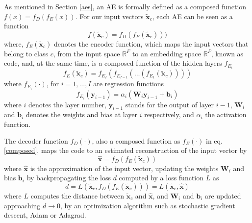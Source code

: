 \documentclass[journal,article,submit,pdftex,moreauthors]{Definitions/mdpi}
\begin{document}
As mentioned in Section \ref{aes}, an AE is formally defined as a composed function $f(x) = f_D(f_E(x))$. For our input vectors $\mathbf{\tilde{x}}_c$, each AE can be seen as a function
\begin{equation}
	f(\mathbf{\tilde{x}}_c) = f_D(f_E(\mathbf{\tilde{x}}_c)))
\end{equation}
where, $f_E(\mathbf{\tilde{x}}_c)$ denotes the encoder function, which maps the input vectors that belong to class $c$, from the input space $\mathbb{R}^F$ to an embedding space $\mathbb{R}^P$, known as code,
and, at the same time, is a composed function of the hidden layers $f_{E_i}$
\begin{equation}
	f_E(\mathbf{\tilde{x}}_c) = f_{E_{I}}(f_{E_{I-1}}(\dots (f_{E_{1}}(\mathbf{\tilde{x}}_c))))
	\label{composed}
\end{equation}
where $f_{E_{i}}(\cdot)$, for $i = 1, \dots, I$ are regression functions
\begin{equation}
	f_{E_{i}}(\mathbf{y}_{i-1}) = \alpha_i(\mathbf{W}_{i}\mathbf{y}_{i-1} + \mathbf{b}_{i})
\end{equation}
where $i$ denotes the layer number, $\mathbf{y}_{i-1}$ stands for the output of layer $i-1$, $\mathbf{W}_{i}$ and $\mathbf{b}_{i}$ denotes the weights and bias at layer $i$ respectively, and $\alpha_i$ the activation function.

The decoder function $f_D(\cdot)$, also a composed function as $f_E(\cdot)$ in eq. \ref{composed}, maps the code to an estimated reconstruction of the input vector by
\begin{equation}
	\mathbf{\hat{x}} = f_{D}(f_E(\mathbf{\mathbf{\tilde{x}}}_c))
\end{equation}
where $\mathbf{\hat{x}}$ is the approximation of the input vector, updating the weights $\mathbf{W}_i$ and bias $\mathbf{b}_i$ by backpropagating the loss $d$ computed by a loss function $L$ as
\begin{equation}
	d = L(\mathbf{\tilde{x}}_c, f_D(f_E(\mathbf{\tilde{x}}_c))) = L(\mathbf{\tilde{x}}_c, \mathbf{\hat{x}})
	\label{loss}
\end{equation}
where $L$ computes the distance between $\mathbf{\tilde{x}}_c$ and $\mathbf{\hat{x}}$, and $\mathbf{W}_i$ and $\mathbf{b}_i$ are updated approaching $d \to 0$, by an optimization algorithm such as stochastic gradient descent, Adam or Adagrad.
\end{document}
